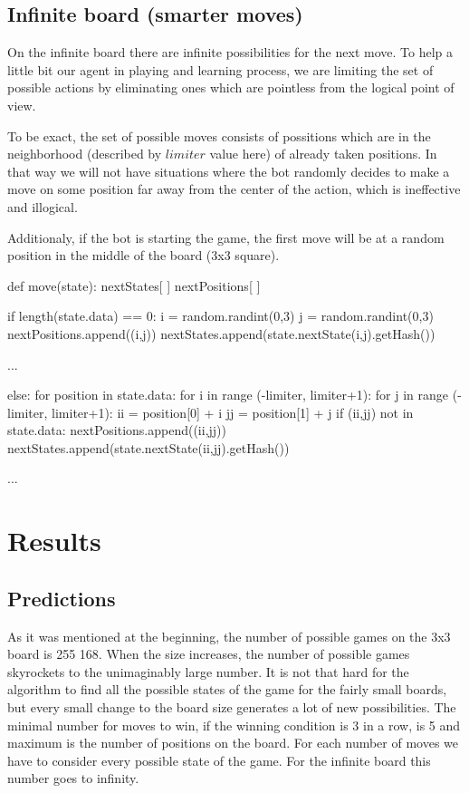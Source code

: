 \documentclass[a4paper,12pt]{book}
\begin{document}
	\section{Infinite board (smarter moves)}

On the infinite board there are infinite possibilities for the next move. To help a little bit our agent in playing and learning process, we are limiting the set of possible actions by eliminating ones which are pointless from the logical point of view. 

To be exact, the set of possible moves consists of possitions which are in the neighborhood (described by $limiter$ value here) of already taken positions. In that way we will not have situations where the bot randomly decides to make a move on some position far away from the center of the action, which is ineffective and illogical. 

Additionaly, if the bot is starting the game, the first move will be at a random position in the middle of the board (3x3 square).

\begin{python}
def move(state):
  nextStates[ ]
  nextPositions[ ]

  if length(state.data) == 0:
    i = random.randint(0,3)
    j = random.randint(0,3)
    nextPositions.append((i,j))
    nextStates.append(state.nextState(i,j).getHash())

  ...
  
  else:
    for position in state.data:
      for i in range (-limiter, limiter+1):
        for j in range (-limiter, limiter+1):
          ii = position[0] + i
          jj = position[1] + j
          if (ii,jj) not in state.data:
             nextPositions.append((ii,jj))
             nextStates.append(state.nextState(ii,jj).getHash())
  
  ...
\end{python}

	\chapter{Results}

	\section{Predictions}

As it was mentioned at the beginning, the number of possible games on the 3x3 board is 255 168. When the size increases, the number of possible games skyrockets to the unimaginably large number. It is not that hard for the algorithm to find all the possible states of the game for the fairly small boards, but every small change to the board size generates a lot of new possibilities. The minimal number for moves to win, if the winning condition is 3 in a row, is 5 and maximum is the number of positions on the board. For each number of moves we have to consider every possible state of the game. For the infinite board this number goes to infinity.
\end{document}
